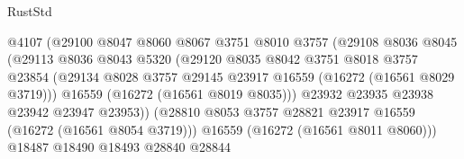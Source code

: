 \begin{lexlean}{RustStd}
\begin{coremodule}
                                      @4107
                                      (@29100
                                        @8047
                                        @8060
                                        @8067
                                        @3751
                                        @8010
                                        @3757
                                        (@29108
                                          @8036
                                          @8045
                                          (@29113
                                            @8036
                                            @8043
                                            @5320
                                            (@29120
                                              @8035
                                              @8042
                                              @3751
                                              @8018
                                              @3757
                                              @23854
                                              (@29134
                                                @8028
                                                @3757
                                                @29145
                                                @23917
                                                @16559
                                                (@16272 (@16561 @8029 @3719)))
                                              @16559
                                              (@16272 (@16561 @8019 @8035)))
                                            @23932
                                            @23935
                                            @23938
                                            @23942
                                            @23947
                                            @23953))
                                        (@28810
                                          @8053
                                          @3757
                                          @28821
                                          @23917
                                          @16559
                                          (@16272 (@16561 @8054 @3719)))
                                        @16559
                                        (@16272 (@16561 @8011 @8060)))
                                      @18487
                                      @18490
                                      @18493
                                      @28840
                                      @28844

\end{coremodule}
\end{lexlean}
